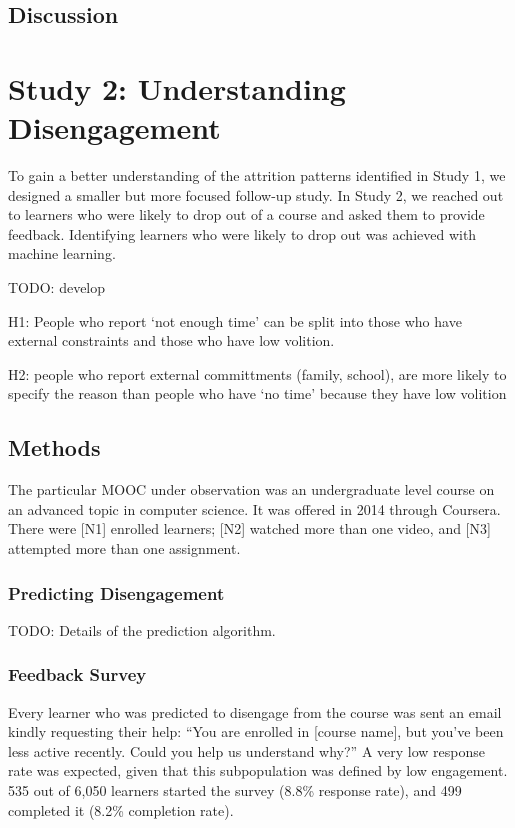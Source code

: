\documentclass{sigchi}\usepackage[]{graphicx}\usepackage[]{color}
\begin{document}
\subsection{Discussion}


\section{Study 2: Understanding Disengagement}

To gain a better understanding of the attrition patterns identified in Study 1, we designed a smaller but more focused follow-up study. In Study 2, we reached out to learners who were likely to drop out of a course and asked them to provide feedback. Identifying learners who were likely to drop out was achieved with machine learning.

TODO: develop

H1: People who report `not enough time' can be split into those who have external constraints and those who have low volition.

H2: people who report external committments (family, school), are more likely to specify the reason than people who have `no time' because they have low volition

\subsection{Methods}

The particular MOOC under observation was an undergraduate level course on an advanced topic in computer science. It was offered in 2014 through Coursera. There were [N1] enrolled learners; [N2] watched more than one video, and [N3] attempted more than one assignment.

\subsubsection{Predicting Disengagement}

TODO: Details of the prediction algorithm.

\subsubsection{Feedback Survey}

Every learner who was predicted to disengage from the course was sent an email kindly requesting their help: ``You are enrolled in [course name], but you've been less active recently. Could you help us understand why?'' A very low response rate was expected, given that this subpopulation was defined by low engagement. 535 out of 6,050 learners started the survey (8.8\% response rate), and 499 completed it (8.2\% completion rate).
\end{document}
